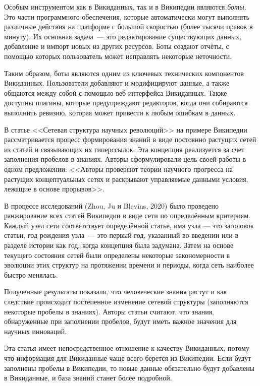 Особым инструментом как в Викиданных, так и в Википедии являются \textit{боты}\footnotemark.  Это части программного обеспечения, которые автоматически могут выполнять различные действия на платформе с большой скоростью (более тысячи правок в минуту). Их основная задача~--- это редактирование существующих данных, добавление и импорт новых из других ресурсов. Боты создают отчёты, с помощью которых пользователь может исправлять некоторые неточности. 

Таким образом, боты являются одним из ключевых технических компонентов Викиданных. Пользователи добавляют и модифицируют данные, а также общаются между собой с помощью веб-интерфейса Викиданных. Также доступны плагины, которые предупреждают редакторов, когда они собираются выполнить ревизию, которая может привести к любым ошибкам в данных.

В статье <<Сетевая структура научных революций>>\cite{Network_structure_revolutions} на примере Википедии рассматривается процесс формирования знаний в виде постоянно растущих сетей из статей и связывающих их гиперссылок. Эта концепция реализуется за счет заполнения пробелов в знаниях. Авторы сформулировали цель своей работы в одном предложении: <<Авторы проверяют теории научного прогресса на растущих концептуальных сетях и раскрывают управляемые данными условия, лежащие в основе прорывов>>\footnotemark. \cite{Network_structure_revolutions}

В процессе исследований (Zhou, Ju и Blevins, 2020)\cite{Network_structure_revolutions}  было проведено ранжирование всех статей Википедии в виде сети по определённым критериям. Каждый узел сети соответствует определённой статье, имя узла --- это заголовок статьи, год рождения узла~--- это первый год, указанный во введении или в разделе истории как год, когда концепция была задумана. Затем на основе текущего состояния сетей были определены некоторые закономерности в эволюции этих структур на протяжении времени и периоды, когда сеть наиболее быстро менялась.

Полученные результаты показали, что человеческие знания растут и как следствие происходит постепенное изменение сетевой структуры (заполняются некоторые пробелы в знаниях). Авторы статьи \cite{Network_structure_revolutions} считают, что знания, обнаруженные при заполнении пробелов, будут иметь важное значения для научных инноваций. 

Эта статья имеет непосредственное отношение к качеству Викиданных, потому что информация для Викиданные чаще всего берется из Википедии. Если будут заполнены пробелы в Википедии, то новые данные обязательно будут добавлены в Викиданные, и база знаний станет более подробной.
